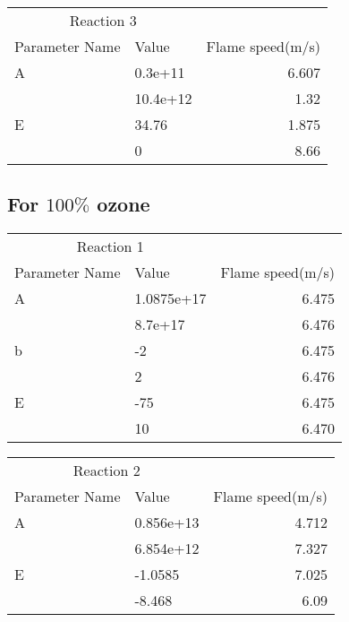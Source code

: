   
     \begin{tabular}{llr}  
    \toprule
    \multicolumn{2}{c}{Reaction 3} \\
    \cmidrule(r){1-2}
    Parameter Name  & Value &  Flame speed(m/s)\\
    \midrule
    A      & 0.3e+11    & 6.607      \\
           &  10.4e+12     & 1.32       \\
   
    E      & 34.76    & 1.875      \\
           &   0     & 8.66       \\
    
    \bottomrule
  \end{tabular}
  
  
    \subsection{For $100\%$ ozone}
   \begin{tabular}{llr}  
    \toprule
    \multicolumn{2}{c}{Reaction 1} \\
    \cmidrule(r){1-2}
    Parameter Name  & Value &  Flame speed(m/s)\\
    \midrule
    A      & 1.0875e+17    & 6.475     \\
           &  8.7e+17     & 6.476       \\
    b      & -2         & 6.475     \\
           &    2       & 6.476       \\
    E      & -75    & 6.475      \\
           &   10     & 6.470       \\
    
    \bottomrule
  \end{tabular}
  
   \begin{tabular}{llr}  
    \toprule
    \multicolumn{2}{c}{Reaction 2} \\
    \cmidrule(r){1-2}
    Parameter Name  & Value &  Flame speed(m/s)\\
    \midrule
    A      & 0.856e+13    & 4.712      \\
           &  6.854e+12     & 7.327       \\
   
    E      & -1.0585    & 7.025     \\
           &   -8.468     & 6.09       \\
    
    \bottomrule
  \end{tabular}
  
